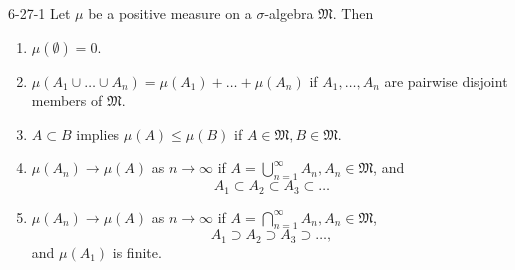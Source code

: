 \documentclass[../main.tex]{subfiles}
\begin{document}
\begin{theorem}{}{6-27-1}
     Let $\mu$ be a positive measure on a $\sigma$-algebra $\mathfrak{M}$. Then
\begin{enumerate}
    \item $\mu(\emptyset) = 0.$
    \item $\mu(A_1 \cup \dots \cup A_n) = \mu(A_1) + \dots + \mu(A_n)$ if $A_1, \dots, A_n$ are pairwise disjoint members of $\mathfrak{M}$.
    \item $A \subset B$ implies $\mu(A) \le \mu(B)$ if $A \in \mathfrak{M}, B \in \mathfrak{M}$.
    \item $\mu(A_n) \to \mu(A)$ as $n \to \infty$ if $A = \bigcup_{n=1}^\infty A_n, A_n \in \mathfrak{M}$, and
    \[ A_1 \subset A_2 \subset A_3 \subset \dots \]
    \item $\mu(A_n) \to \mu(A)$ as $n \to \infty$ if $A = \bigcap_{n=1}^\infty A_n, A_n \in \mathfrak{M}$,
    \[ A_1 \supset A_2 \supset A_3 \supset \dots, \]
    and $\mu(A_1)$ is finite.
\end{enumerate}
\end{theorem}
\end{document}
